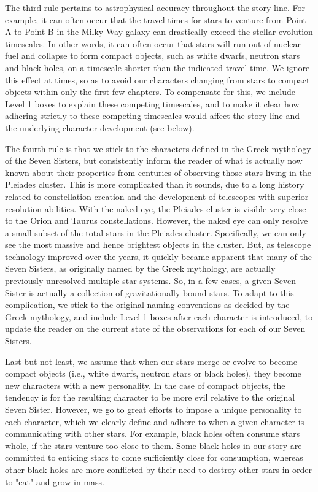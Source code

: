 \documentclass[main.tex]{subfiles}
\begin{document}
\par \nar The third rule pertains to astrophysical accuracy throughout the story line.  For example, it can often occur that the travel times for stars to venture from Point A to Point B in the Milky Way galaxy can drastically exceed the stellar evolution timescales.  In other words, it can often occur that stars will run out of nuclear fuel and collapse to form compact objects, such as white dwarfs, neutron stars and black holes, on a timescale shorter than the indicated travel time.  We ignore this effect at times, so as to avoid our characters changing from stars to compact objects within only the first few chapters.  To compensate for this, we include Level 1 boxes to explain these competing timescales, and to make it clear how adhering strictly to these competing timescales would affect the story line and the underlying character development (see below).

\par \nar The fourth rule is that we stick to the characters defined in the Greek mythology of the Seven Sisters, but consistently inform the reader of what is actually now known about their properties from centuries of observing those stars living in the Pleiades cluster.  This is more complicated than it sounds, due to a long history related to constellation creation and the development of telescopes with superior resolution abilities.  With the naked eye, the Pleiades cluster is visible very close to the Orion and Taurus constellations.  However, the naked eye can only resolve a small subset of the total stars in the Pleiades cluster.  Specifically, we can only see the most massive and hence brightest objects in the cluster.  But, as telescope technology improved over the years, it quickly became apparent that many of the Seven Sisters, as originally named by the Greek mythology, are actually previously unresolved multiple star systems.  So, in a few cases, a given Seven Sister is actually a collection of gravitationally bound stars.  To adapt to this complication, we stick to the original naming conventions as decided by the Greek mythology, and include Level 1 boxes after each character is introduced, to update the reader on the current state of the observations for each of our Seven Sisters.

\par \nar Last but not least, we assume that when our stars merge or evolve to become compact objects (i.e., white dwarfs, neutron stars or black holes), they become new characters with a new personality.  In the case of compact objects, the tendency is for the resulting character to be more evil relative to the original Seven Sister.  However, we go to great efforts to impose a unique personality to each character, which we clearly define and adhere to when a given character is communicating with other stars.  For example, black holes often consume stars whole, if the stars venture too close to them.  Some black holes in our story are committed to enticing stars to come sufficiently close for consumption, whereas other black holes are more conflicted by their need to destroy other stars in order to "eat" and grow in mass.
\end{document}
